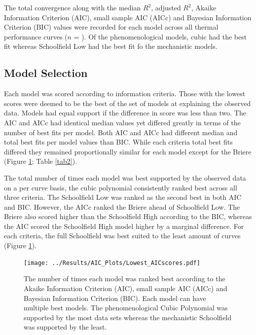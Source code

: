 \documentclass[11pt]{article}
\begin{document}
	
	\begin{table}[H]
		\centering
		\caption{The total convergence along with the median \(R^2\), adjusted \(R^2\), Akaike Information Criterion (AIC), small sample AIC (AICc) and Bayesian Information Criterion (BIC) values were recorded for each model across all thermal performance curves (\(n\) = \protect). Of the phenomenological models, cubic had the best fit whereas Schoolfield Low had the best fit fo the mechanistic models. } 
		
		\label{tab2}
	\end{table}
	
	\subsection{Model Selection}
	Each model was scored according to information criteria. Those with the lowest scores were deemed to be the best of the set of models at explaining the observed data. Models had equal support if the difference in score was less than two. The AIC and AICc had identical median values yet differed greatly in terms of the number of best fits per model. Both AIC and AICc had different median and total best fits per model values than BIC. While each criteria total best fits differed they remained proportionally similar for each model except for the Briere (Figure \ref{fig2}; Table \ref{tab2}). 
	
	The total number of times each model was best supported by the observed data on a per curve basis, the cubic polynomial consistently ranked best across all three criteria. The Schoolfield Low was ranked as the second best in both AIC and BIC. However, the AICc ranked the Briere ahead of Schoolfield Low. The Briere also scored higher than the Schoolfield High according to the BIC, whereas the AIC scored the Schoolfield High model higher by a marginal difference. For each criteria, the full Schoolfield was best suited to the least amount of curves (Figure \ref{fig2}). 
	
	\begin{figure}[H]
		\texttt{[image: ../Results/AIC\_Plots/Lowest\_AICscores.pdf]}
		\caption{The number of times each model was ranked best according to the Akaike Information Criterion (AIC), small sample AIC (AICc) and Bayesian Information Criterion (BIC). Each model can have multiple best models. The phenomenological Cubic Polynomial was supported by the most data sets whereas the mechanistic Schoolfield was supported by the least.}
		\label{fig2}
	\end{figure} 
	
\end{document}
